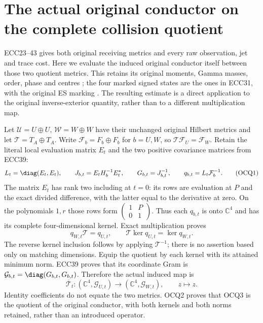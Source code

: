 \section{The actual original conductor on the complete collision quotient}
ECC23--43 gives both original receiving metrics and every raw observation,
jet and trace cost. Here we evaluate the induced original conductor itself
between those two quotient metrics. This retains its original moments,
Gamma masses, order, phase and centres \cite{WCF}; the four marked signed
states are the ones in ECC31, with the original ES marking \cite{ES488}.
The resulting estimate is a direct application to the original
inverse-exterior quantity, rather than to a different multiplication map.

Let $\mathcal U=U\oplus U$, $\mathcal W=W\oplus W$ have their unchanged
original Hilbert metrics and let $\mathcal T=T_A\oplus T_A$. Write
$\mathcal F_b=F_b\oplus F_b$ for $b=U,W$, so
$\mathcal T\mathcal F_U=\mathcal F_W$. Retain the literal local
evaluation matrix $E_t$ and the two positive covariance matrices from ECC39:
\[
 L_t=\diag(E_t,E_t),\qquad
 J_{b,t}=E_tH_b^{-1}E_t^*,\qquad G_{b,t}=J_{b,t}^{-1},\qquad
 q_{b,t}=L_t\mathcal F_b^{-1}.
 \tag{OCQ1}
\]
The matrix $E_t$ has rank two including at $t=0$: its rows are evaluation
at $P$ and the exact divided difference, with the latter equal to the
derivative at zero. On the polynomials $1,r$ those rows form
$\left(\begin{smallmatrix}1&P\\0&1\end{smallmatrix}\right)$.
Thus each $q_{b,t}$ is onto $\mathbb C^4$ and has its complete
four-dimensional kernel. Exact multiplication proves
\[
 q_{W,t}\mathcal T=q_{U,t},\qquad
 \mathcal T\ker q_{U,t}=\ker q_{W,t}.
 \tag{OCQ2}
\]
The reverse kernel inclusion follows by applying $\mathcal T^{-1}$;
there is no assertion based only on matching dimensions.
Equip the quotient by each kernel with its attained minimum norm.
ECC39 proves that its coordinate Gram is
$\mathcal G_{b,t}=\diag(G_{b,t},G_{b,t})$. Therefore the actual induced map is
\[
 \overline{\mathcal T}_t:
 (\mathbb C^4,\mathcal G_{U,t})\longrightarrow
 (\mathbb C^4,\mathcal G_{W,t}),\qquad z\longmapsto z.
 \tag{OCQ3}
\]
Identity coefficients do not equate the two metrics. OCQ2 proves
that OCQ3 is the quotient of the original conductor, with both kernels
and both norms retained, rather than an introduced operator.

